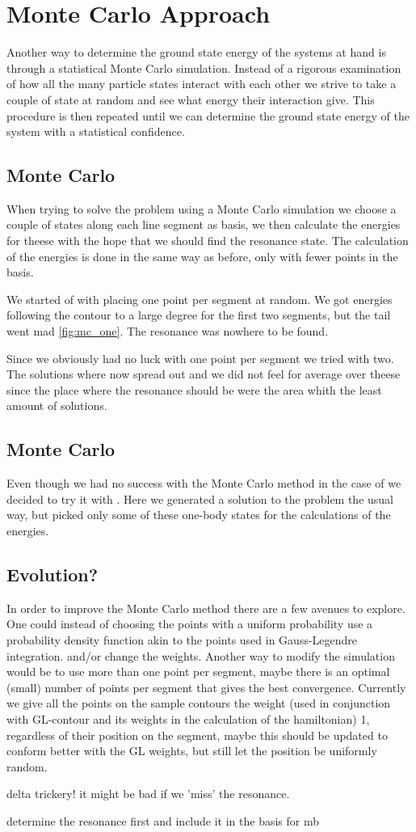 \chapter{Monte Carlo Approach}
\label{cha:monte carlo}

Another way to determine the ground state energy of the systems at hand is through a statistical Monte Carlo simulation. 
Instead of a rigorous examination of how all the many particle states interact with each other we strive to take a couple of state at random and see what energy their interaction give. 
This procedure is then repeated until we can determine the ground state energy of the system with a statistical confidence.

\section{Monte Carlo }
When trying to solve the  problem using a Monte Carlo simulation we choose a couple of states along each line segment as basis, we then calculate the energies for theese with the hope that we should find the resonance state.
The calculation of the energies is done in the same way as before, only with fewer points in the basis.

We started of with placing one point per segment at random.
We got energies following the contour to a large degree for the first two segments, but the tail went mad \cref{fig:mc_one}.
The resonance was nowhere to be found.

Since we obviously had no luck with one point per segment we tried with two.
The solutions where now spread out and we did not feel for average over theese since the place where the resonance should be were the area whith the least amount of solutions.

\section{Monte Carlo }
Even though we had no success with the Monte Carlo method in the case of  we decided to try it with .
Here we generated a solution to the  problem the usual way, but picked only some of these one-body states for the calculations of the energies.


\section{Evolution?}
In order to improve the Monte Carlo method there are a few avenues to explore.
One could instead of choosing the points with a uniform probability use a probability density function akin to the points used in Gauss-Legendre integration. 
and/or change the weights.
Another way to modify the simulation would be to use more than one point per segment, maybe there is an optimal (small) number of points per segment that gives the best convergence. 
Currently we give all the points on the sample contours the weight (used in conjunction with GL-contour and its weights in the calculation of the hamiltonian) 1, regardless of their position on the segment, maybe this should be updated to conform better with the GL weights, but still let the position be uniformly random.

delta trickery! it might be bad if we 'miss' the resonance.

determine the resonance first and include it in the basis for mb